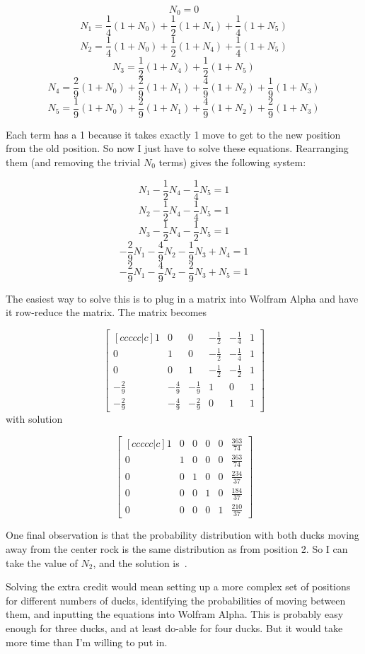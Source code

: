 \documentclass{article}
\begin{document}
\[
N_{0}=0
\]
\[
N_{1}=\frac{1}{4}(1+N_{0})+\frac{1}{2}(1+N_{4})+\frac{1}{4}(1+N_{5})
\]
\[
N_{2}=\frac{1}{4}(1+N_{0})+\frac{1}{2}(1+N_{4})+\frac{1}{4}(1+N_{5})
\]
\[
N_{3}=\frac{1}{2}(1+N_{4})+\frac{1}{2}(1+N_{5})
\]
\[
N_{4}=\frac{2}{9}(1+N_{0})+\frac{2}{9}(1+N_{1})+\frac{4}{9}(1+N_{2})+\frac{1}{9}(1+N_{3})
\]
\[
N_{5}=\frac{1}{9}(1+N_{0})+\frac{2}{9}(1+N_{1})+\frac{4}{9}(1+N_{2})+\frac{2}{9}(1+N_{3})
\]

Each term has a 1 because it takes exactly 1 move to get to the new position from the old position.
So now I just have to solve these equations.
Rearranging them (and removing the trivial $N_{0}$ terms) gives the following system:

\[
N_{1}-\frac{1}{2}N_{4}-\frac{1}{4}N_{5}=1
\]
\[
N_{2}-\frac{1}{2}N_{4}-\frac{1}{4}N_{5}=1
\]
\[
N_{3}-\frac{1}{2}N_{4}-\frac{1}{2}N_{5}=1
\]
\[
-\frac{2}{9}N_{1}-\frac{4}{9}N_{2}-\frac{1}{9}N_{3}+N_{4}=1
\]
\[
-\frac{2}{9}N_{1}-\frac{4}{9}N_{2}-\frac{2}{9}N_{3}+N_{5}=1
\]

The easiest way to solve this is to plug in a matrix into Wolfram Alpha and have it row-reduce the matrix.
The matrix becomes

\[
\begin{bmatrix}[ccccc|c]
1            & 0            & 0            & -\frac{1}{2} & -\frac{1}{4} & 1 \\
0            & 1            & 0            & -\frac{1}{2} & -\frac{1}{4} & 1 \\
0            & 0            & 1            & -\frac{1}{2} & -\frac{1}{2} & 1 \\
-\frac{2}{9} & -\frac{4}{9} & -\frac{1}{9} & 1            & 0            & 1 \\
-\frac{2}{9} & -\frac{4}{9} & -\frac{2}{9} & 0            & 1            & 1
\end{bmatrix}
\]
with solution

\[
\begin{bmatrix}[ccccc|c]
1 & 0 & 0 & 0 & 0 & \frac{363}{74} \\
0 & 1 & 0 & 0 & 0 & \frac{363}{74} \\
0 & 0 & 1 & 0 & 0 & \frac{234}{37} \\
0 & 0 & 0 & 1 & 0 & \frac{184}{37} \\
0 & 0 & 0 & 0 & 1 & \frac{210}{37}
\end{bmatrix}
\]

One final observation is that the probability distribution with both ducks moving away from the center rock is the same distribution as from position 2.
So I can take the value of $N_{2}$, and the solution is
\,.

Solving the extra credit would mean setting up a more complex set of positions for different numbers of ducks, identifying the probabilities of moving between them, and inputting the equations into Wolfram Alpha.
This is probably easy enough for three ducks, and at least do-able for four ducks.
But it would take more time than I'm willing to put in.
\end{document}
